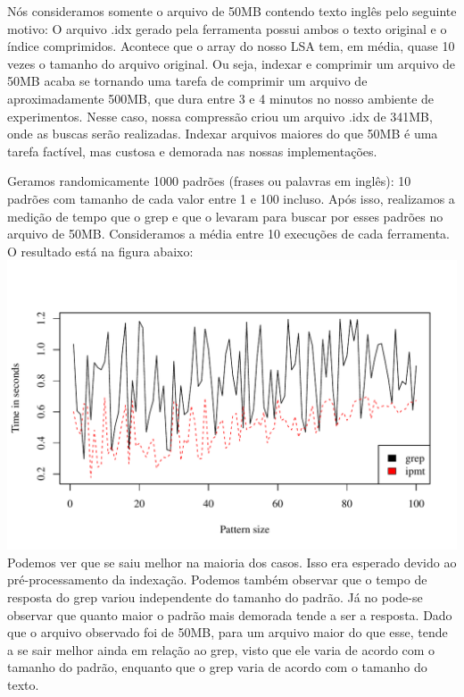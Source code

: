 Nós consideramos somente o arquivo de 50MB contendo texto inglês pelo seguinte motivo: O arquivo .idx
gerado pela ferramenta \ipmt possui ambos o texto original e o índice
comprimidos. Acontece que o array do nosso LSA tem, em média, quase 10 vezes o
tamanho do arquivo original. Ou seja, indexar e comprimir um arquivo de 50MB
acaba se tornando uma tarefa de comprimir um arquivo de aproximadamente 500MB,
que dura entre 3 e 4 minutos no nosso ambiente de experimentos. Nesse caso,
nossa compressão criou um arquivo .idx de 341MB, onde as buscas serão realizadas.
Indexar arquivos maiores do que 50MB é uma tarefa factível, mas
custosa e demorada nas nossas implementações.

Geramos randomicamente 1000 padrões (frases ou palavras em inglês): 10 padrões com tamanho de cada valor
entre 1 e 100 incluso. Após isso, realizamos a medição de tempo que o grep e
que o \ipmt levaram para buscar por esses padrões no arquivo de 50MB.
Consideramos a média entre 10 execuções de cada ferramenta. O
resultado está na figura abaixo:
\\
\includegraphics[scale=0.74]{../experiments/R/pdf/rq2}
\\

Podemos ver que \ipmt se saiu melhor na maioria dos casos. Isso era esperado
devido ao pré-processamento da indexação. Podemos também observar que
o tempo de resposta do grep variou independente do tamanho do padrão. Já no
\ipmt pode-se observar que quanto maior o padrão mais demorada tende a ser a
resposta. Dado que o arquivo observado foi de 50MB, para um arquivo maior do que
esse, \ipmt tende a se sair melhor ainda em relação ao grep, visto que ele varia
de acordo com o tamanho do padrão, enquanto que o grep varia de acordo com o
tamanho do texto.

